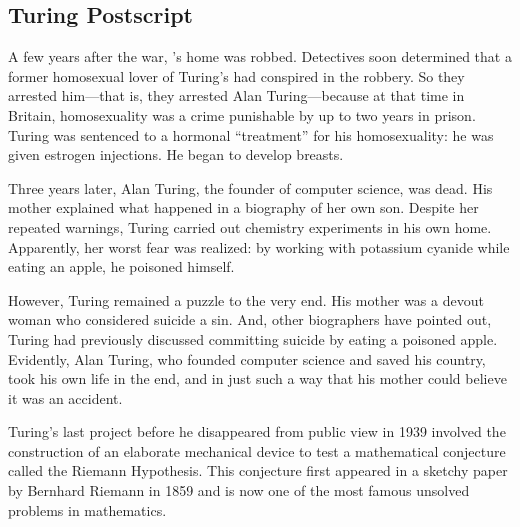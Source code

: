 
\subsection{Turing Postscript}

A few years after the war, 's home was robbed.  Detectives soon
determined that a former homosexual lover of Turing's had conspired in
the robbery.  So they arrested him---that is, they arrested Alan
Turing---because at that time in Britain, homosexuality was a crime punishable by up
to two years in prison.  Turing was sentenced to a
hormonal ``treatment'' for his homosexuality: he was given estrogen
injections.  He began to develop breasts.

Three years later, Alan Turing, the founder of computer science,
was dead.  His mother explained what happened in a biography of her
own son.  Despite her repeated warnings, Turing carried out chemistry
experiments in his own home.  Apparently, her worst fear was realized:
by working with potassium cyanide while eating an apple, he poisoned
himself.

However, Turing remained a puzzle to the very end.  His mother was a
devout woman who considered suicide a sin.  And, other biographers
have pointed out, Turing had previously discussed committing suicide
by eating a poisoned apple.  Evidently, Alan Turing, who founded
computer science and saved his country, took his own life in the end,
and in just such a way that his mother could believe it was an
accident.

Turing's last project before he disappeared from public view in 1939
involved the construction of an elaborate mechanical device to test a
mathematical conjecture called the Riemann Hypothesis.  This
conjecture first appeared in a sketchy paper by Bernhard Riemann in
1859 and is now one of the most famous unsolved problems in
mathematics.

